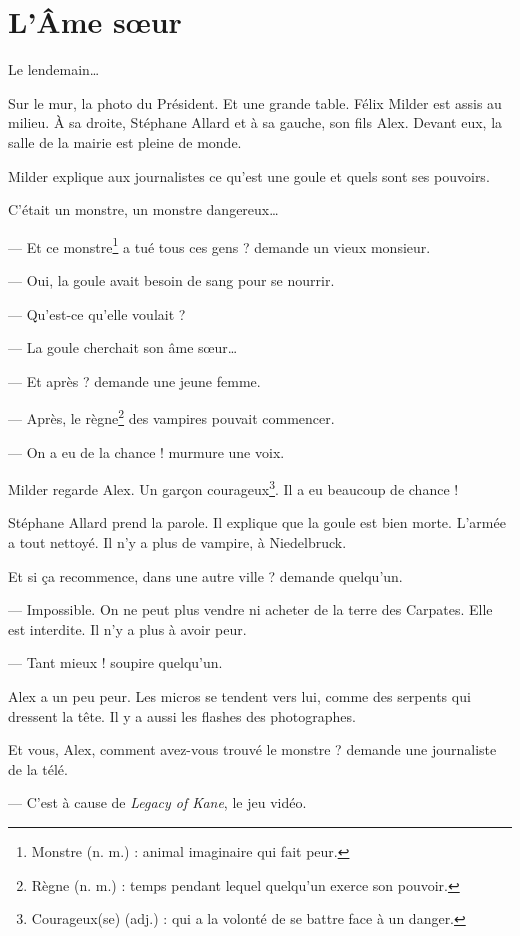 \chapter{L'Âme s\oe{}ur}
Le lendemain\ldots{}

Sur le mur, la photo du Président. Et une grande table. Félix Milder est assis au milieu. À sa droite, Stéphane Allard et à sa
gauche, son fils Alex. Devant eux, la salle de la mairie est pleine de monde.

Milder explique aux journalistes ce qu'est une goule et quels sont ses pouvoirs.

\og C'était un monstre, un monstre dangereux\ldots{}

--- Et ce monstre\footnote{Monstre (n. m.) : animal imaginaire qui fait peur.} a tué tous ces gens ? demande un vieux monsieur.

--- Oui, la goule avait besoin de sang pour se nourrir.

--- Qu'est-ce qu'elle voulait ?

--- La goule cherchait son âme s\oe{}ur\ldots{}

--- Et après ? demande une jeune femme.

--- Après, le règne\footnote{Règne (n. m.) : temps pendant lequel quelqu'un exerce son pouvoir.} des vampires pouvait commencer.

--- On a eu de la chance ! \fg{} murmure une voix.

Milder regarde Alex. Un gar\c{c}on courageux\footnote{Courageux(se) (adj.) : qui a la volonté de se battre face à un danger.}. Il
a eu beaucoup de chance !

Stéphane Allard prend la parole. Il explique que la goule est bien morte. L'armée a tout nettoyé. Il n'y a plus de vampire, à
Niedelbruck.

\og Et si \c{c}a recommence, dans une autre ville ? demande quelqu'un.

--- Impossible. On ne peut plus vendre ni acheter de la terre des Carpates. Elle est interdite. Il n'y a plus à avoir peur.

--- Tant mieux ! \fg{} soupire quelqu'un.

Alex a un peu peur. Les micros se tendent vers lui, comme des serpents qui dressent la tête. Il y a aussi les flashes des
photographes.

\og Et vous, Alex, comment avez-vous trouvé le monstre ? demande une journaliste de la télé.

--- C'est à cause de \emph{Legacy of Kane}, le jeu vidéo.

